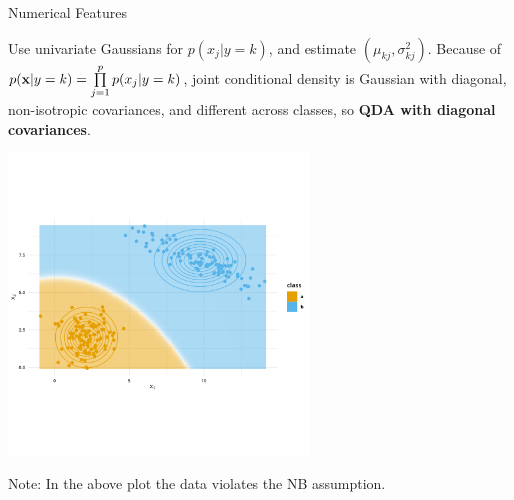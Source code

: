 \documentclass[11pt,compress,t,notes=noshow, xcolor=table]{beamer}
\begin{document}
\begin{vbframe}{Numerical Features}

Use univariate Gaussians for $p(x_j | y=k)$, and estimate $(\mu_{kj}, \sigma^2_{kj})$. Because of $p(\mathbf{x} | y= k) = \prod\limits_{j=1}^p p(x_j|y = k)$, joint conditional density is Gaussian with diagonal, non-isotropic covariances, and different across classes, so \textbf{QDA with diagonal covariances}. 

\lz

\begin{center}
\includegraphics[width=0.6\textwidth, clip = true, trim = {0 100 0 120}]{figure/nb-db.png} 
\end{center}

Note: In the above plot the data violates the NB assumption. 

\end{vbframe}
\end{document}
